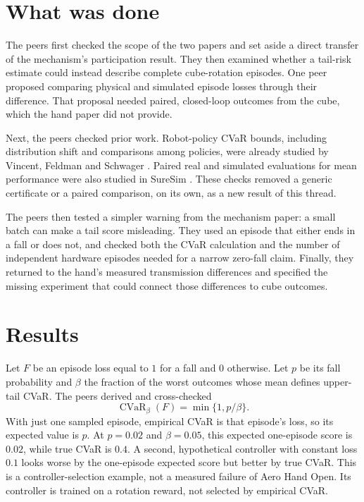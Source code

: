 \documentclass{article}
\begin{document}
\section{What was done}

The peers first checked the scope of the two papers and set aside a direct transfer of the
mechanism's participation result. They then examined whether a tail-risk estimate could instead
describe complete cube-rotation episodes. One peer proposed comparing physical and simulated episode
losses through their difference. That proposal needed paired, closed-loop outcomes from the cube,
which the hand paper did not provide.

Next, the peers checked prior work. Robot-policy CVaR bounds, including distribution shift and
comparisons among policies, were already studied by Vincent, Feldman and Schwager \cite{vincent}.
Paired real and simulated evaluations for mean performance were also studied in SureSim
\cite{suresim}. These checks removed a generic certificate or a paired comparison, on its own, as a
new result of this thread.

The peers then tested a simpler warning from the mechanism paper: a small batch can make a tail
score misleading. They used an episode that either ends in a fall or does not, and checked both the
CVaR calculation and the number of independent hardware episodes needed for a narrow zero-fall
claim. Finally, they returned to the hand's measured transmission differences and specified the
missing experiment that could connect those differences to cube outcomes.

\section{Results}

Let \(F\) be an episode loss equal to \(1\) for a fall and \(0\) otherwise. Let \(p\) be its fall
probability and \(\beta\) the fraction of the worst outcomes whose mean defines upper-tail CVaR. The
peers derived and cross-checked
\[
\operatorname{CVaR}_{\beta}(F)=\min\{1,p/\beta\}.
\]
With just one sampled episode, empirical CVaR is that episode's loss, so its expected value is
\(p\). At \(p=0.02\) and \(\beta=0.05\), this expected one-episode score is \(0.02\), while true
CVaR is \(0.4\). A second, hypothetical controller with constant loss \(0.1\) looks worse by the
one-episode expected score but better by true CVaR. This is a controller-selection example, not a
measured failure of Aero Hand Open. Its controller is trained on a rotation reward, not selected by
empirical CVaR.
\end{document}
